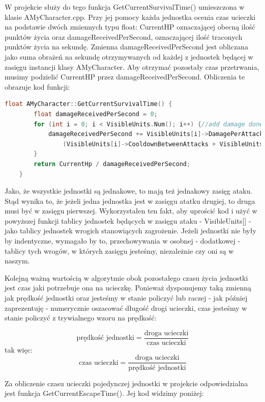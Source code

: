 \documentclass[12pt]{report}
\begin{document}
W projekcie służy do tego funkcja GetCurrentSurvivalTime() umieszczona w klasie AMyCharacter.cpp. Przy jej pomocy każda jednostka ocenia czas ucieczki na podstawie dwóch zmiennych typu float: CurrentHP oznaczającej obecną ilość punktów życia oraz damageReceivedPerSecond, oznaczającej ilość traconych punktów życia na sekundę. Zmienna damageReceivedPerSecond jest obliczana jako suma obrażeń na sekundę otrzymywanych od każdej z jednostek będącej w zasięgu instancji klasy AMyCharacter. Aby otrzymać pozostały czas przetrwania, musimy podzielić CurrentHP przez damageReceivedPerSecond. Obliczenia te obrazuje kod funkcji:

\begin{lstlisting}[language=C++, backgroundcolor=\color{black!5}, basicstyle=\footnotesize, caption=Funkcja GetCurrentSurvivalTime w klasie AMyCharacter.cpp.]
    float AMyCharacter::GetCurrentSurvivalTime() {
		float damageReceivedPerSecond = 0;
		for (int i = 0; i < VisibleUnits.Num(); i++) {//add damage done by single unit to sum, all given values are in seconds
			damageReceivedPerSecond += VisibleUnits[i]->DamagePerAttack /
				(VisibleUnits[i]->CooldownBetweenAttacks + VisibleUnits[i]->AttackDuration);
		}
		return CurrentHp / damageReceivedPerSecond;
	}
\end{lstlisting}

Jako, że wszystkie jednostki są jednakowe, to mają też jednakowy zasięg ataku. Stąd wynika to, że jeżeli jedna jednostka jest w zasięgu atatku drugiej, to druga musi być w zasięgu pierwszej. Wykorzystałen ten fakt, aby uprościć kod i użyć w powyższej funkcji tablicy jednostek będących w zasięgu ataku - VisibleUnits[] - jako tablicy jednostek wrogich stanowiących zagrożenie. Jeżeli jednostki nie były by indentyczne, wymagało by to, przechowywania w osobnej - dodatkowej - tablicy tych wrogów, w których zasięgu jesteśmy, niezależnie czy oni są w naszym.

Kolejną ważną wartością w algorytmie obok pozostałego czasu życia jednostki jest czas jaki potrzebuje ona na ucieczkę. Ponieważ dysponujemy taką zmienną jak prędkość jednostki oraz jesteśmy w stanie policzyć lub raczej - jak później zaprezentuję - numerycznie oszacować długość drogi ucieczki, czas jesteśmy w stanie policzyć z trywialnego wzoru na prędkość:

\[ \text{prędkość jednostki} =  \dfrac{\text{droga ucieczki}}{\text{czas ucieczki}}  \]
tak więc:
\[ {\text{czas ucieczki}} =  \dfrac{\text{droga ucieczki}}{\text{prędkość jednostki}}  \]


Za obliczenie czasu ucieczki pojedynczej jednostki w projekcie odpowiedzialna jest funkcja GetCurrentEscapeTime(). Jej kod widzimy poniżej: 
\end{document}
